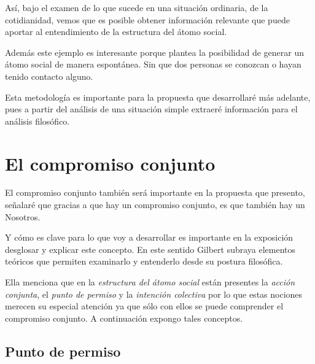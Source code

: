 \documentclass[oneside]{book}
\begin{document}
Así, bajo el examen de lo que sucede en una situación ordinaria, de la cotidianidad, vemos que es posible obtener información relevante que puede aportar al entendimiento de la estructura del átomo social.

Además este ejemplo es interesante porque plantea la posibilidad de generar un átomo social de manera espontánea. Sin que dos personas se conozcan o hayan tenido contacto alguno.

Esta metodología es importante para la propuesta que desarrollaré más adelante, pues a partir del análisis de una situación simple extraeré información para el análisis filosófico.

\section{El compromiso conjunto}

	
El compromiso conjunto también será importante en la propuesta que presento, señalaré que gracias a que hay un compromiso conjunto, es que también hay un Nosotros. 

Y cómo es clave para lo que voy a desarrollar es importante en la exposición desglosar y explicar este concepto. En este sentido Gilbert subraya elementos teóricos que permiten examinarlo y entenderlo desde su postura filosófica.

Ella menciona que en la \textit{estructura del átomo social} están presentes la \textit{acción conjunta}, el \textit{punto de permiso} y la \textit{intención colectiva} por lo que estas nociones merecen su especial atención ya que sólo con ellos se puede comprender el compromiso conjunto. A continuación expongo tales conceptos.

\subsection{Punto de permiso}
	
\end{document}
